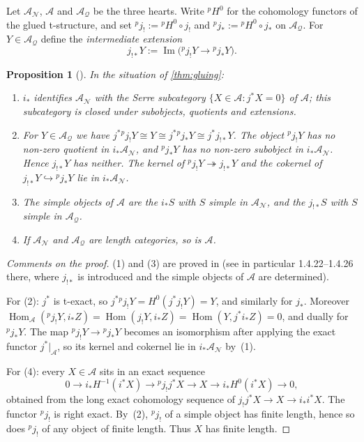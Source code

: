 \documentclass[11pt,reqno]{amsart}
\theoremstyle{plain}
\newtheorem{proposition}[theorem]{Proposition}
\theoremstyle{definition}
\theoremstyle{remark}
\DeclareMathOperator{\Hom}{Hom}
\DeclareMathOperator{\im}{Im}
\newcommand{\cA}{\mathcal{A}}
\newcommand{\cN}{\mathcal{N}}
\newcommand{\cQ}{\mathcal{Q}}
\newcommand{\pH}{{}^{p}\!H}
\begin{document}
Let $\cA_\cN$, $\cA$ and $\cA_\cQ$ be the three hearts. Write $\pH^0$ for the cohomology functors of the glued t-structure, and set ${}^p\!j_!:=\pH^0\circ j_!$ and ${}^p\!j_*:=\pH^0\circ j_*$ on $\cA_\cQ$. For $Y\in\cA_\cQ$ define the \emph{intermediate extension}
\[ j_{!*}Y:=\im\big({}^p\!j_!Y\to{}^p\!j_*Y\big). \]

\begin{proposition}[{\cite[\S1.4]{BBD82}}]\label{prop:glued-heart}
In the situation of \cref{thm:gluing}:
\begin{enumerate}
\item $i_*$ identifies $\cA_\cN$ with the Serre subcategory $\{X\in\cA:j^*X=0\}$ of $\cA$; this subcategory is closed under subobjects, quotients and extensions.
\item For $Y\in\cA_\cQ$ we have $j^*{}^p\!j_!Y\cong Y\cong j^*{}^p\!j_*Y\cong j^*j_{!*}Y$. The object ${}^p\!j_!Y$ has no non-zero quotient in $i_*\cA_\cN$, and ${}^p\!j_*Y$ has no non-zero subobject in $i_*\cA_\cN$. Hence $j_{!*}Y$ has neither. The kernel of ${}^p\!j_!Y\twoheadrightarrow j_{!*}Y$ and the cokernel of $j_{!*}Y\hookrightarrow {}^p\!j_*Y$ lie in $i_*\cA_\cN$.
\item The simple objects of $\cA$ are the $i_*S$ with $S$ simple in $\cA_\cN$, and the $j_{!*}S$ with $S$ simple in $\cA_\cQ$.
\item If $\cA_\cN$ and $\cA_\cQ$ are length categories, so is $\cA$.
\end{enumerate}
\end{proposition}

\begin{proof}[Comments on the proof]
(1) and (3) are proved in \cite[\S1.4]{BBD82} (see in particular 1.4.22--1.4.26 there, where $j_{!*}$ is introduced and the simple objects of $\cA$ are determined).

For (2): $j^*$ is t-exact, so $j^*{}^p\!j_!Y=H^0(j^*j_!Y)=Y$, and similarly for $j_*$. Moreover $\Hom_\cA({}^p\!j_!Y,i_*Z)=\Hom(j_!Y,i_*Z)=\Hom(Y,j^*i_*Z)=0$, and dually for ${}^p\!j_*Y$. The map ${}^p\!j_!Y\to{}^p\!j_*Y$ becomes an isomorphism after applying the exact functor $j^*|_\cA$, so its kernel and cokernel lie in $i_*\cA_\cN$ by~(1).

For (4): every $X\in\cA$ sits in an exact sequence
\[0\to i_*H^{-1}(i^*X)\to{}^p\!j_!j^*X\to X\to i_*H^0(i^*X)\to0,\]
obtained from the long exact cohomology sequence of $j_!j^*X\to X\to i_*i^*X$. The functor ${}^p\!j_!$ is right exact. By~(2), ${}^p\!j_!$ of a simple object has finite length, hence so does ${}^p\!j_!$ of any object of finite length. Thus $X$ has finite length.
\end{proof}
\end{document}
